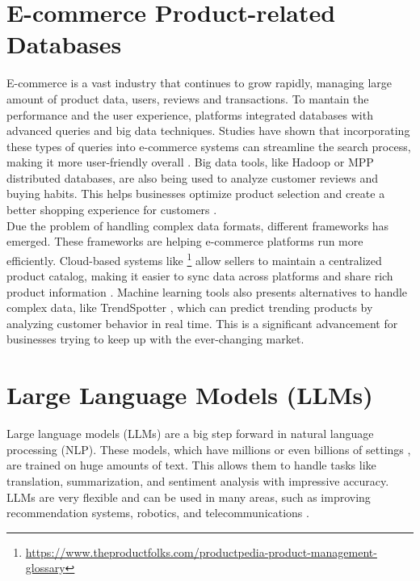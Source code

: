 \section{E-commerce Product-related Databases}
E-commerce is a vast industry that continues to grow rapidly, managing large amount of product data, users, reviews and transactions. To mantain the performance and the user experience, platforms integrated databases with advanced queries and big data techniques. Studies have shown that incorporating these types of queries into e-commerce systems can streamline the search process, making it more user-friendly overall \citep{Muntjir2016}. Big data tools, like Hadoop \citep{5496972} or MPP distributed databases, are also being used to analyze customer reviews and buying habits. This helps businesses optimize product selection and create a better shopping experience for customers \citep{Liang_2020}.
\\

Due the problem of handling complex data formats, different frameworks has emerged. These frameworks are helping e-commerce platforms run more efficiently. Cloud-based systems like \footnote{\url{https://www.theproductfolks.com/productpedia-product-management-glossary}} allow sellers to maintain a centralized product catalog, making it easier to sync data across platforms and share rich product information \citep{10.1007/978-3-319-20895-4_34}. Machine learning tools also presents alternatives to handle complex data, like TrendSpotter \citep{10.1145/3583780.3615503}, which can predict trending products by analyzing customer behavior in real time. This is a significant advancement for businesses trying to keep up with the ever-changing market.


\section{Large Language Models (LLMs)} %
Large language models (LLMs) are a big step forward in natural language processing (NLP). These models, which have millions or even billions of settings \citep{zhao2023survey}, are trained on huge amounts of text. This allows them to handle tasks like translation, summarization, and sentiment analysis with impressive accuracy. LLMs are very flexible and can be used in many areas, such as improving recommendation systems, robotics, and telecommunications \citep{10305960, fan2023fatellm}.
\\

